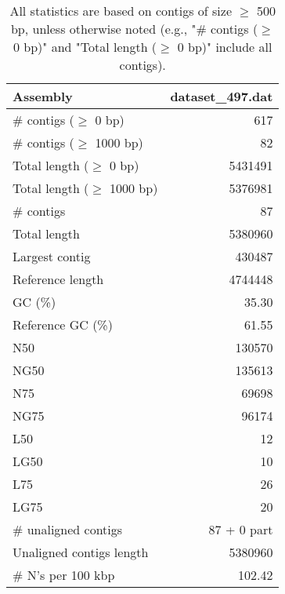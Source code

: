 \documentclass[12pt,a4paper]{article}
\begin{document}
\begin{table}[ht]
\begin{center}
\caption{All statistics are based on contigs of size $\geq$ 500 bp, unless otherwise noted (e.g., "\# contigs ($\geq$ 0 bp)" and "Total length ($\geq$ 0 bp)" include all contigs).}
\begin{tabular}{|l*{1}{|r}|}
\hline
Assembly & dataset\_497.dat \\ \hline
\# contigs ($\geq$ 0 bp) & 617 \\ \hline
\# contigs ($\geq$ 1000 bp) & 82 \\ \hline
Total length ($\geq$ 0 bp) & 5431491 \\ \hline
Total length ($\geq$ 1000 bp) & 5376981 \\ \hline
\# contigs & 87 \\ \hline
Total length & 5380960 \\ \hline
Largest contig & 430487 \\ \hline
Reference length & 4744448 \\ \hline
GC (\%) & 35.30 \\ \hline
Reference GC (\%) & 61.55 \\ \hline
N50 & 130570 \\ \hline
NG50 & 135613 \\ \hline
N75 & 69698 \\ \hline
NG75 & 96174 \\ \hline
L50 & 12 \\ \hline
LG50 & 10 \\ \hline
L75 & 26 \\ \hline
LG75 & 20 \\ \hline
\# unaligned contigs & 87 + 0 part \\ \hline
Unaligned contigs length & 5380960 \\ \hline
\# N's per 100 kbp & 102.42 \\ \hline
\end{tabular}
\end{center}
\end{table}
\end{document}
